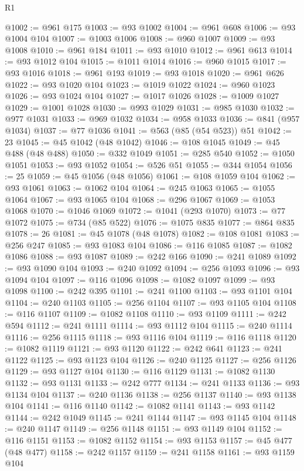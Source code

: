 \begin{lexlean}{R1}
\begin{coremodule}
@1002 := @961 @175
@1003 := @93 @1002
@1004 := @961 @608
@1006 := @93 @1004 @104
@1007 := @1003 @1006
@1008 := @960 @1007
@1009 := @93 @1008
@1010 := @961 @184
@1011 := @93 @1010
@1012 := @961 @613
@1014 := @93 @1012 @104
@1015 := @1011 @1014
@1016 := @960 @1015
@1017 := @93 @1016
@1018 := @961 @193
@1019 := @93 @1018
@1020 := @961 @626
@1022 := @93 @1020 @104
@1023 := @1019 @1022
@1024 := @960 @1023
@1026 := @93 @1024 @104
@1027 := @1017 @1026
@1028 := @1009 @1027
@1029 := @1001 @1028
@1030 := @993 @1029
@1031 := @985 @1030
@1032 := @977 @1031
@1033 := @969 @1032
@1034 := @958 @1033
@1036 := @841 (@957 @1034)
@1037 := @77 @1036
@1041 := @563 (@85 (@54 @523)) @51
@1042 := 23
@1045 := @45 @1042 (@48 @1042)
@1046 := @108 @1045
@1049 := @45 @488 (@48 @488)
@1050 := @332 @1049
@1051 := @285 @540
@1052 := @1050 @1051
@1053 := @93 @1052
@1054 := @526 @51
@1055 := @344 @1054
@1056 := 25
@1059 := @45 @1056 (@48 @1056)
@1061 := @108 @1059 @104
@1062 := @93 @1061
@1063 := @1062 @104
@1064 := @245 @1063
@1065 := @1055 @1064
@1067 := @93 @1065 @104
@1068 := @296 @1067
@1069 := @1053 @1068
@1070 := @1046 @1069
@1072 := @1041 (@293 @1070)
@1073 := @77 @1072
@1075 := @734 (@85 @522)
@1076 := @1075 @835
@1077 := @864 @835
@1078 := 26
@1081 := @45 @1078 (@48 @1078)
@1082 := @108 @1081
@1083 := @256 @247
@1085 := @93 @1083 @104
@1086 := @116 @1085
@1087 := @1082 @1086
@1088 := @93 @1087
@1089 := @242 @166
@1090 := @241 @1089
@1092 := @93 @1090 @104
@1093 := @240 @1092
@1094 := @256 @1093
@1096 := @93 @1094 @104
@1097 := @116 @1096
@1098 := @1082 @1097
@1099 := @93 @1098
@1100 := @242 @395
@1101 := @241 @1100
@1103 := @93 @1101 @104
@1104 := @240 @1103
@1105 := @256 @1104
@1107 := @93 @1105 @104
@1108 := @116 @1107
@1109 := @1082 @1108
@1110 := @93 @1109
@1111 := @242 @594
@1112 := @241 @1111
@1114 := @93 @1112 @104
@1115 := @240 @1114
@1116 := @256 @1115
@1118 := @93 @1116 @104
@1119 := @116 @1118
@1120 := @1082 @1119
@1121 := @93 @1120
@1122 := @242 @641
@1123 := @241 @1122
@1125 := @93 @1123 @104
@1126 := @240 @1125
@1127 := @256 @1126
@1129 := @93 @1127 @104
@1130 := @116 @1129
@1131 := @1082 @1130
@1132 := @93 @1131
@1133 := @242 @777
@1134 := @241 @1133
@1136 := @93 @1134 @104
@1137 := @240 @1136
@1138 := @256 @1137
@1140 := @93 @1138 @104
@1141 := @116 @1140
@1142 := @1082 @1141
@1143 := @93 @1142
@1144 := @242 @1049
@1145 := @241 @1144
@1147 := @93 @1145 @104
@1148 := @240 @1147
@1149 := @256 @1148
@1151 := @93 @1149 @104
@1152 := @116 @1151
@1153 := @1082 @1152
@1154 := @93 @1153
@1157 := @45 @477 (@48 @477)
@1158 := @242 @1157
@1159 := @241 @1158
@1161 := @93 @1159 @104

\end{coremodule}
\end{lexlean}

